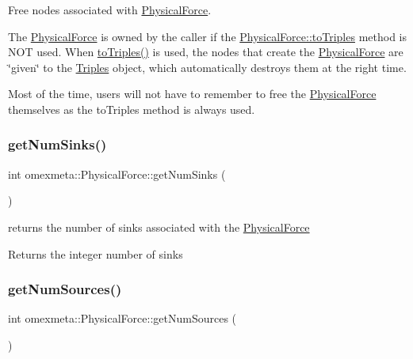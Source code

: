 Free nodes associated with \hyperlink{classomexmeta_1_1PhysicalForce}{Physical\+Force}. 

The \hyperlink{classomexmeta_1_1PhysicalForce}{Physical\+Force} is owned by the caller if the \hyperlink{classomexmeta_1_1PhysicalForce_a39dd511aee85130d07cb6ffb3f8e87f0}{Physical\+Force\+::to\+Triples} method is N\+OT used. When \hyperlink{classomexmeta_1_1PhysicalForce_a39dd511aee85130d07cb6ffb3f8e87f0}{to\+Triples()} is used, the nodes that create the \hyperlink{classomexmeta_1_1PhysicalForce}{Physical\+Force} are \char`\"{}given\char`\"{} to the \hyperlink{classomexmeta_1_1Triples}{Triples} object, which automatically destroys them at the right time.

Most of the time, users will not have to remember to free the \hyperlink{classomexmeta_1_1PhysicalForce}{Physical\+Force} themselves as the to\+Triples method is always used. \mbox{\label{classomexmeta_1_1PhysicalForce_a1135c75705b59afa7037bab313009534}} 
\subsubsection{\texorpdfstring{get\+Num\+Sinks()}{getNumSinks()}}
{\footnotesize\ttfamily int omexmeta\+::\+Physical\+Force\+::get\+Num\+Sinks (\begin{DoxyParamCaption}{ }\end{DoxyParamCaption})}



returns the number of sinks associated with the \hyperlink{classomexmeta_1_1PhysicalForce}{Physical\+Force} 

\begin{DoxyReturn}{Returns}
the integer number of sinks 
\end{DoxyReturn}
\mbox{\label{classomexmeta_1_1PhysicalForce_a9910c8edac57daf70faa1f1e2e0208d1}} 
\subsubsection{\texorpdfstring{get\+Num\+Sources()}{getNumSources()}}
{\footnotesize\ttfamily int omexmeta\+::\+Physical\+Force\+::get\+Num\+Sources (\begin{DoxyParamCaption}{ }\end{DoxyParamCaption})}



